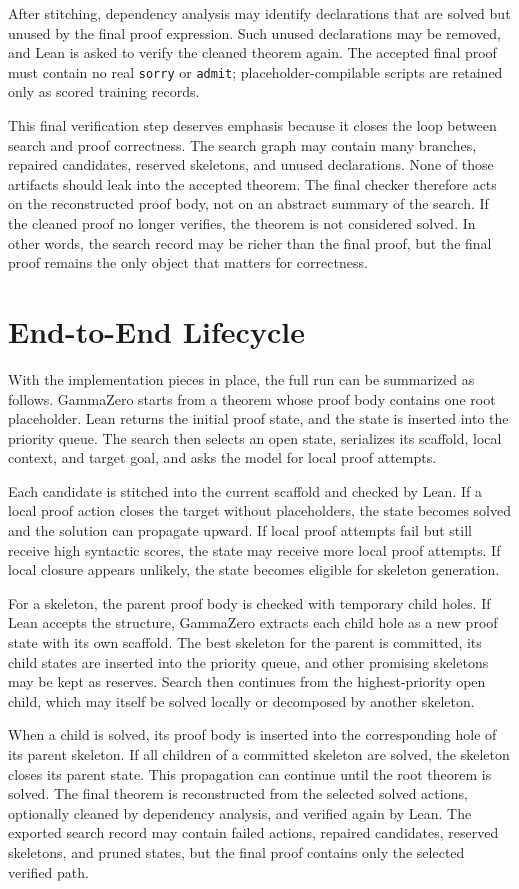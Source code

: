 After stitching, dependency analysis may identify declarations that are solved but unused by the final proof expression. Such unused declarations may be removed, and Lean is asked to verify the cleaned theorem again. The accepted final proof must contain no real \texttt{sorry} or \texttt{admit}; placeholder-compilable scripts are retained only as scored training records.

This final verification step deserves emphasis because it closes the loop between search and proof
correctness. The search graph may contain many branches, repaired candidates, reserved skeletons, and
unused declarations. None of those artifacts should leak into the accepted theorem. The
final checker therefore acts on the reconstructed proof body, not on an abstract summary of the search.
If the cleaned proof no longer verifies, the theorem is not considered solved. In other words, the search
record may be richer than the final proof, but the final proof remains the only object that matters for
correctness.

\section{End-to-End Lifecycle}

With the implementation pieces in place, the full run can be summarized as follows. GammaZero starts
from a theorem whose proof body contains one root placeholder. Lean returns the initial proof state, and
the state is inserted into the priority queue. The search then selects an open state, serializes its scaffold,
local context, and target goal, and asks the model for local proof attempts.

Each candidate is stitched into the current scaffold and checked by Lean. If a local proof action closes
the target without placeholders, the state becomes solved and the solution can propagate upward. If local
proof attempts fail but still receive high syntactic scores, the state may receive more local proof
attempts. If local closure appears unlikely, the state becomes eligible for skeleton generation.

For a skeleton, the parent proof body is checked with temporary child holes. If Lean accepts the
structure, GammaZero extracts each child hole as a new proof state with its own scaffold. The best
skeleton for the parent is committed, its child states are inserted into the priority queue, and other
promising skeletons may be kept as reserves. Search then continues from the highest-priority open child,
which may itself be solved locally or decomposed by another skeleton.

When a child is solved, its proof body is inserted into the corresponding hole of its parent skeleton. If
all children of a committed skeleton are solved, the skeleton closes its parent state. This propagation can
continue until the root theorem is solved. The final theorem is reconstructed from the selected solved
actions, optionally cleaned by dependency analysis, and verified again by Lean. The exported search
record may contain failed actions, repaired candidates, reserved skeletons, and pruned states, but the
final proof contains only the selected verified path.
